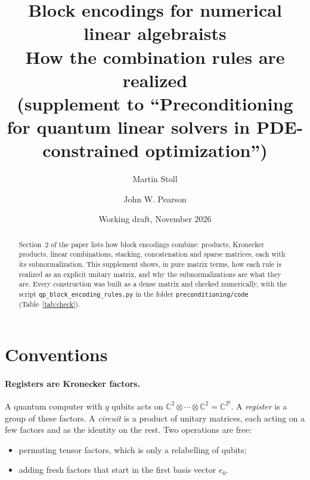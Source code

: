 \documentclass[11pt,a4paper]{article}
\title{Block encodings for numerical linear algebraists\\[2pt]
\large How the combination rules are realized\\
(supplement to ``Preconditioning for quantum linear solvers in PDE-constrained optimization'')}
\author{Martin Stoll \and John W. Pearson}
\date{Working draft, November 2026}
\newcommand{\C}{\mathbb{C}}
\begin{document}
\maketitle

\begin{abstract}
Section~2 of the paper lists how block encodings combine: products, Kronecker
products, linear combinations, stacking, concatenation and sparse matrices,
each with its subnormalization. This supplement shows, in pure matrix
terms, how each rule is realized as an explicit unitary matrix, and why the
subnormalizations are what they are. Every construction was built as a dense
matrix and checked numerically, with the script
\texttt{qp\_block\_encoding\_rules.py} in the folder \texttt{preconditioning/code}
(Table~\ref{tab:check}).
\end{abstract}

\section{Conventions}

\paragraph{Registers are Kronecker factors.} A quantum computer with $q$
qubits acts on $\C^2\otimes\cdots\otimes\C^2=\C^{2^q}$. A \emph{register} is a group of
these factors. A \emph{circuit} is a product of unitary matrices, each acting
on a few factors and as the identity on the rest. Two operations are free:
\begin{itemize}
\item permuting tensor factors, which is only a relabelling of qubits;
\item adding fresh factors that start in the first basis vector $e_0$.
\end{itemize}
\end{document}
